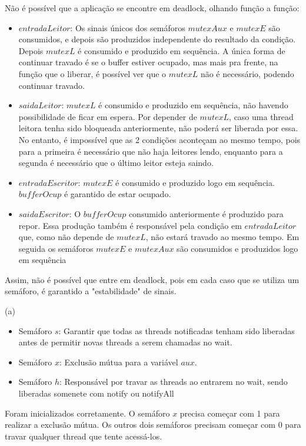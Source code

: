 \documentclass{homework}
\begin{document}
Não é possível que a aplicação se encontre em deadlock, olhando função a função:
\begin{itemize}
    \item $entradaLeitor$: Os sinais únicos dos semáforos $mutexAux$ e $mutexE$ são consumidos, e depois são produzidos independente do resultado da condição. Depois $mutexL$ é consumido e produzido em sequência. A única forma de continuar travado é se o buffer estiver ocupado, mas mais pra frente, na função que o liberar, é possível ver que o $mutexL$ não é necessário, podendo continuar travado.
    \item $saidaLeitor$: $mutexL$ é consumido e produzido em sequência, não havendo possibilidade de ficar em espera. Por depender de $mutexL$, caso uma thread leitora tenha sido bloqueada anteriormente, não poderá ser liberada por essa. No entanto, é impossível que as 2 condições aconteçam ao mesmo tempo, pois para a primeira é necessário que não haja leitores lendo, enquanto para a segunda é necessário que o último leitor esteja saindo.
    \item $entradaEscritor$: $mutexE$ é consumido e produzido logo em sequência. $bufferOcup$ é garantido de estar ocupado.
    \item $saidaEscritor$: O $bufferOcup$ consumido anteriormente é produzido para repor. Essa produção também é responsável pela condição em $entradaLeitor$ que, como não depende de $mutexL$, não estará travado ao mesmo tempo. Em seguida os semáforos $mutexE$ e $mutexAux$ são consumidos e produzidos logo em sequência
\end{itemize}

Assim, não é possível que entre em deadlock, pois em cada caso que se utiliza um semáforo, é garantido a "estabilidade" de sinais.

\exercise*
(a)
\begin{itemize}
    \item Semáforo $s$: Garantir que todas as threads notificadas tenham sido liberadas antes de permitir novas threads a serem chamadas no wait.
    \item Semáforo $x$: Exclusão mútua para a variável $aux$.
    \item Semáforo $h$: Responsável por travar as threads ao entrarem no wait, sendo liberadas somenete com notify ou notifyAll 
\end{itemize}

Foram inicializados corretamente. O semáforo $x$ precisa começar com 1 para realizar a exclusão mútua. Os outros dois semáforos precisam começar com 0 para travar qualquer thread que tente acessá-los.
\end{document}
